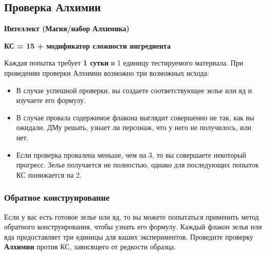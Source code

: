 \documentclass[a4paper, 9pt, twocolumn]{book}
\begin{document}
	
	
	\subsection{Проверка Алхимии}
	
	\textbf{Интеллект (Магия/набор Алхимика)}
	
	\textbf{КС = 15 + модификатор сложности ингредиента}
	
	Каждая попытка требует \textbf{1 сутки} и 1 единицу тестируемого материала. При проведении проверки Алхимии возможно три возможных исхода:
	
	\begin{itemize}
		\item В случае успешной проверки, вы создаете соответствующее зелье или яд и изучаете его формулу.
		
		\item В случае провала содержимое флакона выглядит совершенно не так, как вы ожидали. ДМу решать, узнает ли персонаж, что у него не получилось, или нет.
		
		\item Если проверка провалена меньше, чем на 3, то вы совершаете некоторый прогресс. Зелье получается не полностью, однако для последующих попыток КС понижается на 2.
	\end{itemize}

	\subsubsection{Обратное конструирование}
	
	Если у вас есть готовое зелье или яд, то вы можете попытаться применить метод обратного конструирования, чтобы узнать его формулу. Каждый флакон зелья или яда предоставляет три единицы для ваших экспериментов. Проведите проверку \textbf{Алхимии} против КС, зависящего от редкости образца.
	
\end{document}
